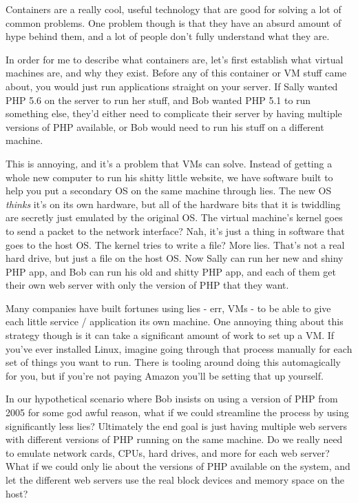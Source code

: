 \documentclass[9pt]{extarticle} %
\begin{document}
\begin{minipage}[t]{.66\linewidth} %
\vspace{-0.4cm}
\hypertarget{firstnews}{}
	
Containers are a really cool, useful technology that are good for solving a lot
of common problems. One problem though is that they have an absurd amount of 
hype behind them, and a lot of people don't fully understand what they are. 

In order for me to describe what containers are, let's first establish what
virtual machines are, and why they exist. Before any of this container or VM
stuff came about, you would just run applications straight on your server. 
If Sally wanted PHP 5.6 on the server to run her stuff, and Bob wanted PHP 5.1
to run something else, they'd either need to complicate their server by having multiple versions of PHP available, or Bob would need to run his stuff on a different machine.

This is annoying, and it's a problem that VMs can solve. Instead of getting a
whole new computer to run his shitty little website, we have software built to
help you put a secondary OS on the same machine through lies. The new OS
\textit{thinks} it's on its own hardware, but all of the hardware bits that
it is twiddling are secretly just emulated by the original OS. The virtual
machine's kernel goes to send a packet to the network interface? Nah, it's 
just a thing in software that goes to the host OS. The kernel tries to write a
file? More lies. That's not a real hard drive, but just a file on the host OS. 
Now Sally can run her new and shiny PHP app, and Bob can run his old and shitty
PHP app, and each of them get their own web server with only the version of PHP
that they want.

Many companies have built fortunes using lies - err, VMs - to be able to give
each little service / application its own machine. One annoying thing about
this strategy though is it can take a significant amount of work to set up a
VM. If you've ever installed Linux, imagine going through that process manually
for each set of things you want to run. There is tooling around doing this
automagically for you, but if you're not paying Amazon you'll be setting that
up yourself.

In our hypothetical scenario where Bob insists on using a version of PHP from
2005 for some god awful reason, what if we could streamline the process by
using significantly less lies? Ultimately the end goal is just having multiple
web servers with different versions of PHP running on the same machine. Do we
really need to emulate network cards, CPUs, hard drives, and more for each web
server? What if we could only lie about the versions of PHP available on the
system, and let the different web servers use the real block devices and memory
space on the host?


\end{minipage}
\end{document}
